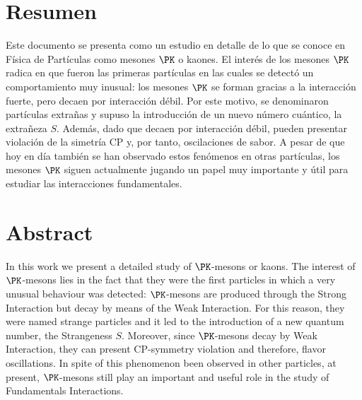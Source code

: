 \chapter*{Resumen}
\label{cap:abstract}

Este documento se presenta como un estudio en detalle de lo que se conoce en Física de Partículas como mesones $\PK$ o kaones. El interés de los mesones $\PK$ radica en que fueron las primeras partículas en las cuales se detectó un comportamiento muy inusual: los mesones $\PK$ se forman gracias a la interacción fuerte, pero decaen por interacción débil. Por este motivo, se denominaron partículas extrañas y supuso la introducción de un nuevo número cuántico, la extrañeza $S$. Además, dado que decaen por interacción débil, pueden presentar violación de la simetría CP y, por tanto, oscilaciones de sabor. A pesar de que hoy en día también se han observado estos fenómenos en otras partículas, los mesones $\PK$ siguen actualmente jugando un papel muy importante y útil para estudiar las interacciones fundamentales. 
\vspace{2cm}

{\let\clearpage\relax\chapter*{Abstract}}
In this work we present a detailed study of $\PK$-mesons or kaons. The interest of $\PK$-mesons lies in the fact that they were the first particles in which a very unusual behaviour was detected: $\PK$-mesons are produced through the Strong Interaction but decay by means of the Weak Interaction. For this reason, they were named strange particles and it led to the introduction of a new quantum number, the Strangeness $S$. Moreover, since $\PK$-mesons decay by Weak Interaction, they can present CP-symmetry violation and therefore, flavor oscillations. In spite of this phenomenon been observed  in other particles, at present, $\PK$-mesons still play an important and useful role in the study of Fundamentals Interactions.